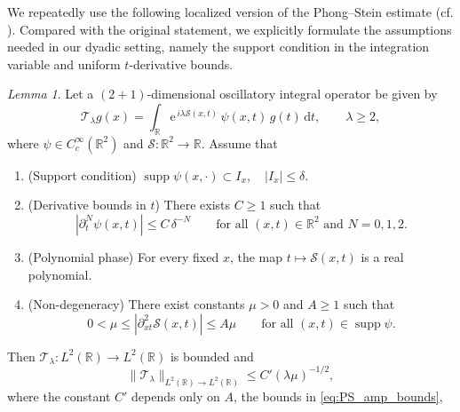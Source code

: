 \documentclass[10pt]{amsart}
\numberwithin{equation}{section}
\theoremstyle{definition}
\theoremstyle{remark}
\theoremstyle{remark}
\newtheorem{lemma}{Lemma}
\newcommand{\R}{\mathbb{R}}
\newcommand{\e}{\mathrm{e}}
\newcommand{\supp}{\operatorname{supp}}
\begin{document}
	We repeatedly use the following localized version of the
    Phong--Stein estimate (cf. \cite[Lemma~ 1.1]{PS94}).
    Compared with the original statement,
    we explicitly formulate the assumptions needed in our dyadic setting,
    namely the support condition in the integration variable and uniform
    $t$-derivative bounds.
	
	\begin{lemma}\label{lem:PS}
		Let a $(2+1)$-dimensional oscillatory integral operator be given by
		\begin{equation}\label{eq:PS_op}
			\mathcal{T}_\lambda g(x)
			=
			\int_{\R}\e^{\,i\lambda \mathcal S(x,t)}\,\psi(x,t)\,g(t)\,\mathrm dt,
			\qquad \lambda\ge 2,
		\end{equation}
		where $\psi\in C_c^\infty(\R^2)$ and $\mathcal S:\R^2\to\R$.
		Assume that
		\begin{enumerate}[leftmargin=2.2em]
			 \item (Support condition) 
			$\supp ψ(x,\cdot)\subset I_x,\quad|I_x|\le\delta$.
            
			\item (Derivative bounds in $t$) There exists $C\ge 1$ such that
			\begin{equation}\label{eq:PS_amp_bounds}
				|\partial_t^N\psi(x,t)|\le C\,\delta^{-N}
				\qquad \text{for all }(x,t)\in\R^2\text{ and }N=0,1,2.
			\end{equation}
			
			\item (Polynomial phase) For every fixed $x$, the map $t\mapsto \mathcal S(x,t)$ is a real polynomial.
			
			\item (Non-degeneracy) There exist constants $\mu>0$ and $A\ge 1$ such that
			\begin{equation*}
				0<\mu \le |\partial_{xt}^2 \mathcal S(x,t)|\le A\mu
				\qquad \text{for all }(x,t)\in\supp\psi.
			\end{equation*}
		\end{enumerate}
		Then $\mathcal{T}_\lambda:L^2(\R)\to L^2(\R)$ is bounded and
		\begin{equation}\label{eq:PS_bound}
			\|\mathcal{T}_\lambda\|_{L^2(\R)\to L^2(\R)}
			\le C'(\lambda\mu)^{-1/2},
		\end{equation}
		where the constant $C'$ depends only on
        $A$, the bounds in \eqref{eq:PS_amp_bounds},
	\end{lemma}
\end{document}

